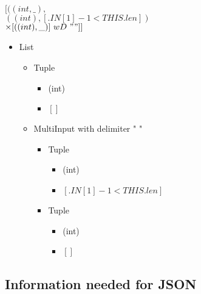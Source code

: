 \documentclass[11pt]{article}
\begin{document}
$[((int, \_),$\\
$((int), [.IN[1]-1 < THIS.len])$\\
$\times [((int), \_)]\ wD\ " "]]$\\

\begin{itemize}
  \item List 
  \begin{itemize}
    \item Tuple 
    \begin{itemize}
      \item (int)
      \item $[]$
    \end{itemize}
    \item MultiInput with delimiter " "
    \begin{itemize}
      \item Tuple
      \begin{itemize}
	\item (int)
	\item $[.IN[1]-1 < THIS.len]$
      \end{itemize}
      \item Tuple
      \begin{itemize}
	\item (int)
	\item $[]$
      \end{itemize}
    \end{itemize}
  \end{itemize}
\end{itemize}


\subsection{Information needed for JSON}
\end{document}
